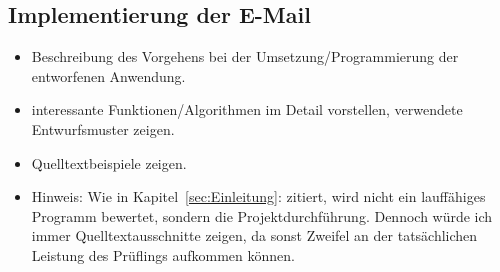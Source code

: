\subsection{Implementierung der E-Mail}
\label{sec:ImplementierungGeschaeftslogik}

\begin{itemize}
	\item Beschreibung des Vorgehens bei der Umsetzung/Programmierung der entworfenen Anwendung.
	\item \Ggfs interessante Funktionen/Algorithmen im Detail vorstellen, verwendete Entwurfsmuster zeigen.
	\item Quelltextbeispiele zeigen.
	\item Hinweis: Wie in Kapitel~\ref{sec:Einleitung}:  zitiert, wird nicht ein lauffähiges Programm bewertet, sondern die Projektdurchführung. Dennoch würde ich immer Quelltextausschnitte zeigen, da sonst Zweifel an der tatsächlichen Leistung des Prüflings aufkommen können.
\end{itemize}

